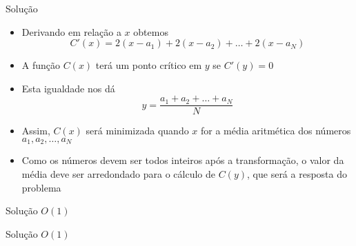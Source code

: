 \begin{frame}[fragile]{Solução}

    \begin{itemize}
        \item Derivando em relação a $x$ obtemos
        \[
            C'(x) = 2(x - a_1) + 2(x - a_2) + \ldots + 2(x - a_N)
        \]

        \item A função $C(x)$ terá um ponto crítico em $y$ se $C'(y) = 0$

        \item Esta igualdade nos dá
        \[
            y = \frac{a_1 + a_2 + \ldots + a_N}{N}
        \]

        \item Assim, $C(x)$ será minimizada quando $x$ for a média aritmética dos números
            $a_1, a_2, \ldots, a_N$

        \item Como os números devem ser todos inteiros após a transformação, o valor da média
            deve ser arredondado para o cálculo de $C(y)$, que será a resposta do problema
    \end{itemize}

\end{frame}
\begin{frame}[fragile]{Solução $O(1)$}
\end{frame}

\begin{frame}[fragile]{Solução $O(1)$}
\end{frame}
